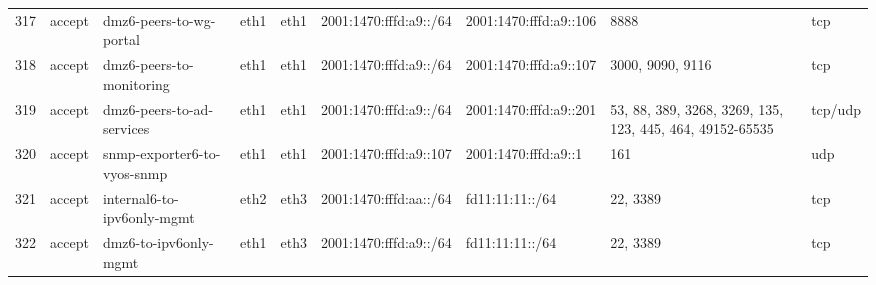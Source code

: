 \documentclass[a4paper,11pt]{article}
\begin{document}
\begin{landscape}
\begin{longtable}{|l|l|l|l|l|l|l|p{2.2cm}|l|}
317 & accept & dmz6-peers-to-wg-portal & eth1 & eth1 & 2001:1470:fffd:a9::/64 & 2001:1470:fffd:a9::106 & 8888 & tcp \\
318 & accept & dmz6-peers-to-monitoring & eth1 & eth1 & 2001:1470:fffd:a9::/64 & 2001:1470:fffd:a9::107 & 3000, 9090, 9116 & tcp \\
319 & accept & dmz6-peers-to-ad-services & eth1 & eth1 & 2001:1470:fffd:a9::/64 & 2001:1470:fffd:a9::201 & 53, 88, 389, 3268, 3269, 135, 123, 445, 464, 49152-65535 & tcp/udp \\
320 & accept & snmp-exporter6-to-vyos-snmp & eth1 & eth1 & 2001:1470:fffd:a9::107 & 2001:1470:fffd:a9::1 & 161 & udp \\
321 & accept & internal6-to-ipv6only-mgmt & eth2 & eth3 & 2001:1470:fffd:aa::/64 & fd11:11:11::/64 & 22, 3389 & tcp \\
322 & accept & dmz6-to-ipv6only-mgmt & eth1 & eth3 & 2001:1470:fffd:a9::/64 & fd11:11:11::/64 & 22, 3389 & tcp \\
\hline
\end{longtable}


\end{landscape}
\end{document}
